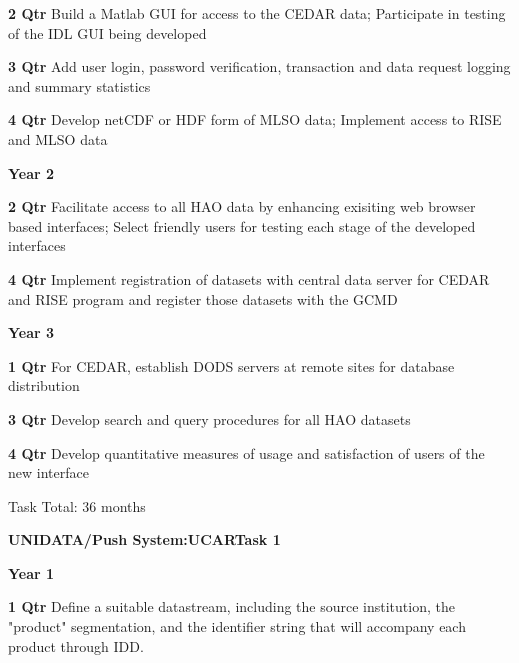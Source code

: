 \documentclass[12pt]{article}
\begin{document}
\begin{description}
\begin{description}
   \item{\bf 2 Qtr} Build a Matlab GUI for access to the CEDAR data;
     Participate in testing of the IDL GUI being developed

   \item{\bf 3 Qtr} Add user login, password verification, transaction and
     data request logging and summary statistics

   \item{\bf 4 Qtr} Develop netCDF or HDF form of MLSO data; Implement access
     to RISE and MLSO data

   \end{description}
 \item{\large \bf Year 2  }
   \begin{description}
   \item{\bf 2 Qtr} Facilitate access to all HAO data by enhancing exisiting
     web browser based interfaces; Select friendly users for testing each
     stage of the developed interfaces

   \item{\bf 4 Qtr} Implement registration of datasets with central data
     server for CEDAR and RISE program and register those datasets with the
     GCMD

   \end{description}
 \item{\large \bf Year 3}
   \begin{description}
   \item{\bf 1 Qtr} For CEDAR, establish DODS servers at remote sites for
     database distribution

   \item{\bf 3 Qtr} Develop search and query procedures for all HAO datasets
     

   \item{\bf 4 Qtr} Develop quantitative measures of usage and satisfaction
     of users of the new interface

 Task Total: 36 months

   \end{description}
\begin{center}
{\large \bf UNIDATA/Push System:UCARTask 1}
\end{center}

 \item{\large \bf Year 1}
   \begin{description}
  
   \item{\bf 1 Qtr} Define a suitable datastream, including the source
     institution, the "product" segmentation, and the identifier string that
     will accompany each product through IDD.


\end{description}
\end{description}
\end{document}
